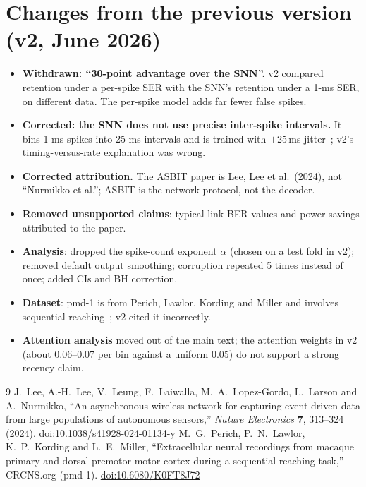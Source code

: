 \documentclass[11pt,a4paper]{article}
\begin{document}
\section{Changes from the previous version (v2, June 2026)}\label{app:changes}
\begin{itemize}
  \item \textbf{Withdrawn: ``30-point advantage over the SNN''.} v2 compared retention under a per-spike SER with the
  SNN's retention under a 1-ms SER, on different data. The per-spike model adds far fewer false spikes.
  \item \textbf{Corrected: the SNN does not use precise inter-spike intervals.} It bins 1-ms spikes into 25-ms intervals
  and is trained with $\pm$25\,ms jitter~\cite{lee2024}; v2's timing-versus-rate explanation was wrong.
  \item \textbf{Corrected attribution.} The ASBIT paper is Lee, Lee et al.\ (2024), not ``Nurmikko et al.'';
  ASBIT is the network protocol, not the decoder.
  \item \textbf{Removed unsupported claims}: typical link BER values and power savings attributed to the paper.
  \item \textbf{Analysis}: dropped the spike-count exponent $\alpha$ (chosen on a test fold in v2); removed default
  output smoothing; corruption repeated 5 times instead of once; added CIs and BH correction.
  \item \textbf{Dataset}: pmd-1 is from Perich, Lawlor, Kording and Miller and involves sequential reaching~\cite{pmd1};
  v2 cited it incorrectly.
  \item \textbf{Attention analysis} moved out of the main text; the attention weights in v2 (about 0.06--0.07 per bin
  against a uniform 0.05) do not support a strong recency claim.
\end{itemize}

\begin{thebibliography}{9}\small
{} J.~Lee, A.-H.~Lee, V.~Leung, F.~Laiwalla, M.~A.~Lopez-Gordo, L.~Larson and A.~Nurmikko,
``An asynchronous wireless network for capturing event-driven data from large populations of autonomous sensors,''
\textit{Nature Electronics} \textbf{7}, 313--324 (2024). \href{https://doi.org/10.1038/s41928-024-01134-y}{doi:10.1038/s41928-024-01134-y}
 M.~G.~Perich, P.~N.~Lawlor, K.~P.~Kording and L.~E.~Miller, ``Extracellular neural recordings from
macaque primary and dorsal premotor motor cortex during a sequential reaching task,'' CRCNS.org (pmd-1).
\href{https://doi.org/10.6080/K0FT8J72}{doi:10.6080/K0FT8J72}
\end{thebibliography}
\end{document}
